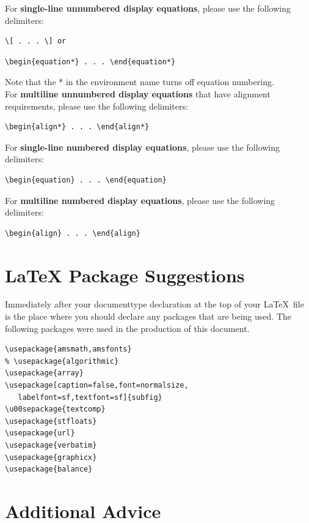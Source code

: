 \documentclass[lettersize,journal]{IEEEtran} %
\begin{document}
For {\bf{single-line unnumbered display equations}}, please use the following delimiters: 
\begin{verbatim}\[ . . . \] or \end{verbatim} 
\begin{verbatim}\begin{equation*} . . . \end{equation*}\end{verbatim}
Note that the * in the environment name turns off equation numbering.\\

For {\bf{multiline unnumbered display equations}} that have alignment requirements, please use the following delimiters: 
\begin{verbatim}
\begin{align*} . . . \end{align*}
\end{verbatim}

For {\bf{single-line numbered display equations}}, please use the following delimiters: 
\begin{verbatim}
\begin{equation} . . . \end{equation}
\end{verbatim}

For {\bf{multiline numbered display equations}}, please use the following delimiters: 
\begin{verbatim}
\begin{align} . . . \end{align}
\end{verbatim}

\section{LaTeX Package Suggestions}
\noindent Immediately after your documenttype declaration at the top of your \LaTeX\ file is the place where you should declare any packages that are being used. The following packages were used in the production of this document.
\begin{verbatim}
\usepackage{amsmath,amsfonts}
% \usepackage{algorithmic}
\usepackage{array}
\usepackage[caption=false,font=normalsize,
   labelfont=sf,textfont=sf]{subfig}
\u00sepackage{textcomp}
\usepackage{stfloats}
\usepackage{url}
\usepackage{verbatim}
\usepackage{graphicx}
\usepackage{balance}
\end{verbatim}

\section{Additional Advice}
\end{document}
